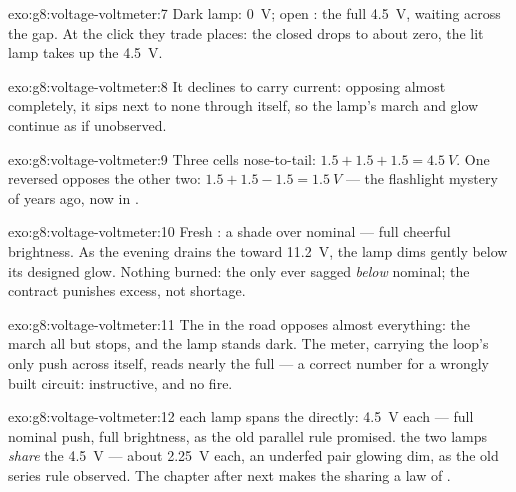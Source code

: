 \begin{solution}{exo:g8:voltage-voltmeter:7}
Dark lamp: \qty{0}{V}; open : the full \qty{4.5}{V},
waiting across the gap. At the click they trade places: the
closed  drops to about zero, the lit lamp takes up the
\qty{4.5}{V}.
\end{solution}

\begin{solution}{exo:g8:voltage-voltmeter:8}
It declines to carry current: opposing almost completely, it
sips next to none through itself, so the lamp's march and glow
continue as if unobserved.
\end{solution}

\begin{solution}{exo:g8:voltage-voltmeter:9}
Three cells nose-to-tail: $1.5 + 1.5 + 1.5 = \qty{4.5}{V}$. One
reversed opposes the other two: $1.5 + 1.5 - 1.5 = \qty{1.5}{V}$
--- the flashlight mystery of years ago, now in .
\end{solution}

\begin{solution}{exo:g8:voltage-voltmeter:10}
Fresh : a shade over nominal --- full cheerful
brightness. As the evening drains the  toward
\qty{11.2}{V}, the lamp dims gently below its designed glow.
Nothing burned: the  only ever sagged \emph{below}
nominal; the contract punishes excess, not shortage.
\end{solution}

\begin{solution}{exo:g8:voltage-voltmeter:11}
The  in the road opposes almost everything: the march
all but stops, and the lamp stands dark. The meter, carrying
the loop's only push across itself, reads nearly the 
full  --- a correct number for a wrongly built circuit:
instructive, and no fire.
\end{solution}

\begin{solution}{exo:g8:voltage-voltmeter:12}
 each lamp spans the  directly: \qty{4.5}{V}
each --- full nominal push, full brightness, as the old parallel
rule promised.  the two lamps \emph{share} the
\qty{4.5}{V} --- about \qty{2.25}{V} each, an underfed pair
glowing dim, as the old series rule observed. The chapter after
next makes the sharing a law of .
\end{solution}

